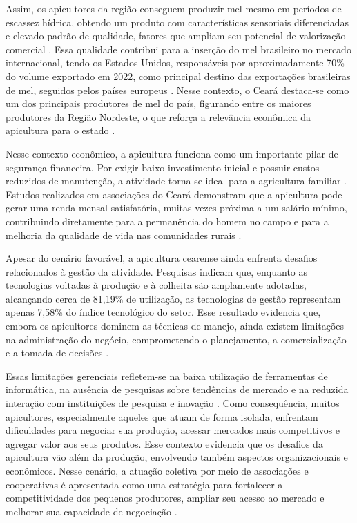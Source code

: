 Assim, os apicultores da região conseguem produzir mel mesmo em períodos de escassez hídrica, obtendo um produto com características sensoriais diferenciadas e elevado padrão de qualidade, fatores que ampliam seu potencial de valorização comercial \cite{khan2009desempenho}. Essa qualidade contribui para a inserção do mel brasileiro no mercado internacional, tendo os Estados Unidos, responsáveis por aproximadamente 70\% do volume exportado em 2022, como principal destino das exportações brasileiras de mel, seguidos pelos países europeus \cite{veras2025}. Nesse contexto, o Ceará destaca-se como um dos principais produtores de mel do país, figurando entre os maiores produtores da Região Nordeste, o que reforça a relevância econômica da apicultura para o estado \cite{albuquerque2025impacto}.

Nesse contexto econômico, a apicultura funciona como um importante pilar de segurança financeira. Por exigir baixo investimento inicial e possuir custos reduzidos de manutenção, a atividade torna-se ideal para a agricultura familiar \cite{marreiro2025apicultura}. Estudos realizados em associações do Ceará demonstram que a apicultura pode gerar uma renda mensal satisfatória, muitas vezes próxima a um salário mínimo, contribuindo diretamente para a permanência do homem no campo e para a melhoria da qualidade de vida nas comunidades rurais \cite{barbosa2020}.

Apesar do cenário favorável, a apicultura cearense ainda enfrenta desafios relacionados à gestão da atividade. Pesquisas indicam que, enquanto as tecnologias voltadas à produção e à colheita são amplamente adotadas, alcançando cerca de 81,19\% de utilização, as tecnologias de gestão representam apenas 7,58\% do índice tecnológico do setor. Esse resultado evidencia que, embora os apicultores dominem as técnicas de manejo, ainda existem limitações na administração do negócio, comprometendo o planejamento, a comercialização e a tomada de decisões \cite{khan2009desempenho}.

Essas limitações gerenciais refletem-se na baixa utilização de ferramentas de informática, na ausência de pesquisas sobre tendências de mercado e na reduzida interação com instituições de pesquisa e inovação \cite{khan2009desempenho}. Como consequência, muitos apicultores, especialmente aqueles que atuam de forma isolada, enfrentam dificuldades para negociar sua produção, acessar mercados mais competitivos e agregar valor aos seus produtos. Esse contexto evidencia que os desafios da apicultura vão além da produção, envolvendo também aspectos organizacionais e econômicos. Nesse cenário, a atuação coletiva por meio de associações e cooperativas é apresentada como uma estratégia para fortalecer a competitividade dos pequenos produtores, ampliar seu acesso ao mercado e melhorar sua capacidade de negociação \cite{oliveira2018casaapis}.   


